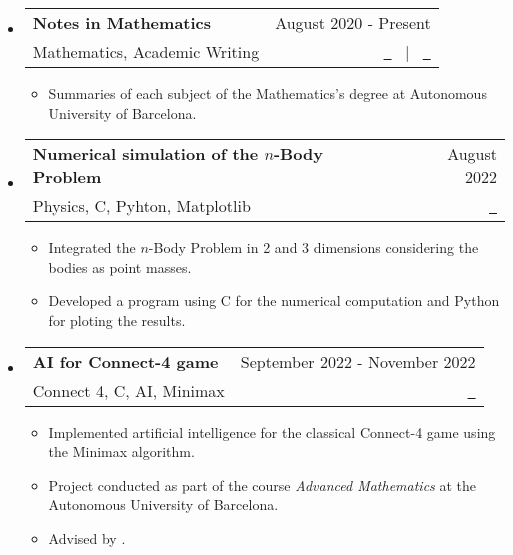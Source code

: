 \documentclass[a4paper,11pt]{article}
\makeatletter
\newcommand{\resumeItemListEnd}{\end{itemize}}
\newcommand{\resumeQuadHeading}[4]{
  \item
  \begin{tabular*}{0.96\textwidth}[t]{l@{\extracolsep{\fill}}r}
    \textbf{#1} & \small #2 \\
    \small#3 & \small #4 \\
  \end{tabular*}
}
\newcommand{\resumeHeadingListStart}{
  \begin{itemize}[leftmargin=0.15in, label={}]
}
\newcommand{\resumeHeadingListEnd}{\end{itemize}}
\makeatother
\begin{document}
\resumeHeadingListStart{}
\resumeQuadHeading{Notes in Mathematics}{August 2020 - Present}{Mathematics, Academic Writing}{\href{https://victorballester7.github.io/complete-summaries/}{\faGlobe \ \graydotuline{Website}} \ $|$ \ \href{https://github.com/victorballester7/complete-summaries}{\faGithub \ \graydotuline{Code}}}
\begin{itemize}[leftmargin=3em, itemsep=0.1em, topsep=2pt]
  \item \small Summaries of each subject of the Mathematics's degree at Autonomous University of Barcelona.
\end{itemize}
\resumeItemListEnd{}

\resumeHeadingListStart{}
\resumeQuadHeading{Numerical simulation of the $n$-Body Problem}{August 2022}{Physics, C, Pyhton, Matplotlib}{\href{https://github.com/victorballester7/n-body_problem}{\faGithub \ \graydotuline{Code}}}
\begin{itemize}[leftmargin=3em, itemsep=0.1em, topsep=2pt]
  \item \small Integrated the $n$-Body Problem in 2 and 3 dimensions considering the bodies as point masses.
  \item \small Developed a program using C for the numerical computation and Python for ploting the results.
\end{itemize}
\resumeHeadingListEnd{}

\resumeHeadingListStart{}
\resumeQuadHeading{AI for Connect-4 game}{September 2022 - November 2022}{Connect 4, C, AI, Minimax}{\href{https://github.com/victorballester7/connect4}{\faGithub \ \graydotuline{Code}}}
\begin{itemize}[leftmargin=3em, itemsep=0.1em, topsep=2pt]
  \item \small Implemented artificial intelligence for the classical Connect-4 game using the Minimax algorithm.
  \item \small Project conducted as part of the course \textit{Advanced Mathematics} at the Autonomous University of Barcelona.
  \item \small Advised by \href{https://portalrecerca.uab.cat/en/persons/vicente-soler-ruz}{}.
\end{itemize}
\resumeHeadingListEnd{}
\end{document}
